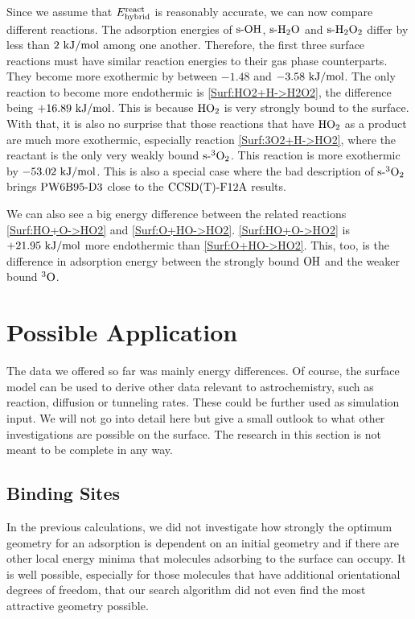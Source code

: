 \documentclass[8.5pt,twoside,twocolumn]{article}
\newcommand\sur{\enmat{\te{s-}}}
\newcommand\tripo{\enmat{{^3\te{O}}}}
\newcommand\tripot{\enmat{{^3\ot}}}
\newcommand\kmo{\enmat{\te {kJ/mol}}}
\theoremstyle{standard}
\begin{document}
Since we assume that $E^{\text{react}}_{\text{hybrid}}$ is reasonably accurate, we can now compare
different reactions. The adsorption energies of $\sur\ho$, $\sur\hto$ and
$\sur\htot$ differ by less than $2~\kmo$ among one another. Therefore,
the first three surface reactions must have similar reaction energies
to their gas phase counterparts. They become more exothermic by between
$-1.48$ and $-3.58~\kmo$. The only reaction to become more endothermic
is \eqref{Surf:HO2+H->H2O2}, the difference being $+16.89~\kmo$. This
is because $\text H \text O_2$ is very strongly
bound to the surface. With that, it is also no surprise that those
reactions that have $\text H \text O_2$ as a product are much more exothermic, especially
reaction \eqref{Surf:3O2+H->HO2}, where the reactant is the only
very weakly bound $\sur\tripot$. This reaction is more exothermic
by $-53.02~\kmo$. This is also a special case where the bad description
of $\sur\tripot$ brings $\text{PW6B95}\text{-D3}$ close to the $\text{CCSD(T)-F12A}$ results.

We can also see a big energy difference between the related reactions
\eqref{Surf:HO+O->HO2} and \eqref{Surf:O+HO->HO2}. \eqref{Surf:HO+O->HO2}
is $+21.95~\kmo$ more endothermic than \eqref{Surf:O+HO->HO2}. This, too,
is the difference in adsorption energy between the strongly bound $\text O \text H$
and the weaker bound $\tripo$.

\section{Possible Application}

The data we offered so far was mainly energy differences. Of course, the
surface model can be used to derive other data relevant to astrochemistry,
such as reaction, diffusion or tunneling rates. These could be further used
as simulation input. We will not go into detail here but give a small
outlook to what other investigations are possible on the surface. The research
in this section is not meant to be complete in any way.

\subsection{Binding Sites}
\newcommand\rmax{\enmat{r_{\te{max}}}}
\newcommand\rmin{\enmat{r_{\te{min}}}}
\label{Sec:Adv:Binding}


In the previous calculations, we did not investigate how strongly the optimum
geometry for an adsorption is dependent on an initial geometry and if there
are other local energy minima that molecules adsorbing to the surface can occupy.
It is well possible, especially for those molecules that have additional orientational
degrees of freedom, that our search algorithm did not even find the most attractive
geometry possible.
\end{document}
